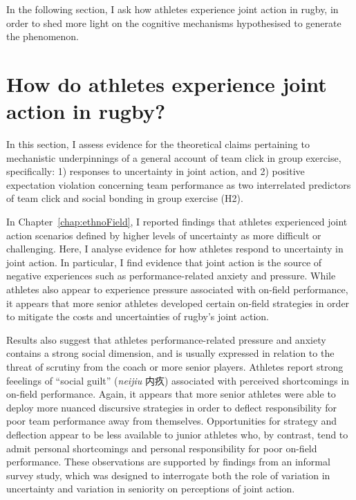 \begin{CJK}{UTF8}{gbsn}
In the following section, I ask how athletes experience joint action in rugby, in order to shed more light on the cognitive mechanisms hypothesised to generate the phenomenon.



























\section{How do athletes experience joint action in rugby?\label{sect:athleteExperienceJA}}
In this section, I assess evidence for the theoretical claims pertaining to mechanistic underpinnings of a general account of team click in group exercise, specifically: 1) responses to uncertainty in joint action, and 2) positive expectation violation concerning team performance as two interrelated predictors of team click and social bonding in group exercise (H2).

In Chapter~\ref{chap:ethnoField}, I reported findings that athletes experienced joint action scenarios defined by higher levels of uncertainty as more difficult or challenging.  Here, I analyse evidence for how athletes respond to uncertainty in joint action.  In particular, I find evidence that joint action is the source of negative experiences such as performance-related anxiety and pressure.  While athletes also appear to experience pressure associated with on-field performance, it appears that more senior athletes developed certain on-field strategies in order to mitigate the costs and uncertainties of rugby's joint action.

Results also suggest that athletes performance-related pressure and anxiety contains a strong social dimension, and is usually expressed in relation to the threat of scrutiny from the coach or more senior players.  Athletes report strong feeelings of ``social guilt'' (\textit{neijiu} 内疚) associated with perceived shortcomings in on-field performance.  Again, it appears that more senior athletes were able to deploy more nuanced discursive strategies in order to deflect responsibility for poor team performance away from themselves.  Opportunities for strategy and deflection appear to be less available to junior athletes who, by contrast, tend to admit personal shortcomings and personal responsibility for poor on-field performance.  These observations are supported by findings from an informal survey study, which was designed to interrogate both the role of variation in uncertainty and variation in seniority on perceptions of joint action.


\end{CJK}
